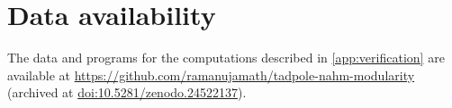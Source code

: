 \documentclass[11pt,reqno]{amsart}
\numberwithin{equation}{section}
\theoremstyle{plain}
\theoremstyle{definition}
\theoremstyle{remark}
\begin{document}
\maketitle









\appendix



\section*{Data availability}
The data and programs for the computations described in \cref{app:verification} are available at \url{https://github.com/ramanujamath/tadpole-nahm-modularity} (archived at \href{https://doi.org/10.5281/zenodo.24522137}{doi:10.5281/zenodo.24522137}).


\end{document}
